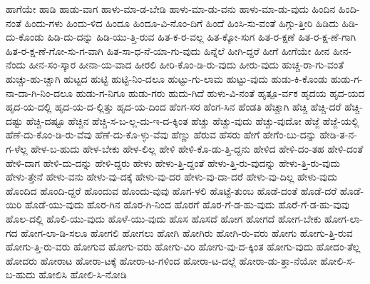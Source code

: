 {ಹಾಗೆಯೇ
ಹಾಡಿ
ಹಾಡು-ವಾಗ
ಹಾಳು-ಮಾ-ಡ-ಬೇಡಿ
ಹಾಳು-ಮಾ-ಡು-ವನು
ಹಾಳು-ಮಾ-ಡು-ವುದು
ಹಿಂದಿನ
ಹಿಂದಿ-ನಂತೆ
ಹಿಂದು-ಗಳು
ಹಿಂದು-ಳಿದ
ಹಿಂದೂ
ಹಿಂದೂ-ವಿ-ನೊಂ-ದಿಗೆ
ಹಿಂದೆ
ಹಿಂಸಿ-ಸು-ವಂತೆ
ಹಿಗ್ಗು-ತ್ತೀರಿ
ಹಿಡಿದು
ಹಿಡಿ-ದು-ಕೊಂಡು
ಹಿಡಿ-ದು-ದನ್ನು
ಹಿಡಿ-ಯು-ತ್ತಿ-ರುವ
ಹಿತ-ಕ-ರ-ವಲ್ಲ
ಹಿತ-ಕ್ಕೋ-ಸುಗ
ಹಿತ-ರ-ಕ್ಷಣೆ
ಹಿತ-ರ-ಕ್ಷ-ಣೆ-ಗಾಗಿ
ಹಿತ-ರ-ಕ್ಷ-ಣೆ-ಗೋ-ಸು-ಗ-ವಾಗಿ
ಹಿತ-ಸಾ-ಧ-ನೆ-ಯಾ-ಗು-ವುದು
ಹಿನ್ನೆಲೆ
ಹೀಗಿ-ದ್ದರೆ
ಹೀಗೆ
ಹೀಗೆಯೇ
ಹೀನ
ಹೀನ-ನೆಂದು
ಹೀನ-ಸಂ-ಸ್ಕಾರ
ಹೀನಾ-ಯ-ವಾದ
ಹೀರಲಿ
ಹೀರಿ-ಕೊಂ-ಡಿ-ರು-ವುದು
ಹೀರು-ವುದು
ಹುಚ್ಚ-ರಾ-ಗು-ವಂತೆ
ಹುಚ್ಚು-ಹು-ಚ್ಚಾಗಿ
ಹುಟ್ಟದ
ಹುಟ್ಟಿ
ಹುಟ್ಟಿ-ನಿಂ-ದಲೂ
ಹುಟ್ಟು-ಗು-ಲಾಮ
ಹುಟ್ಟು-ವುದು
ಹುಡು-ಕಿ-ಕೊಂಡು
ಹುಡು-ಗ-ನಾ-ದಾ-ಗಿ-ನಿಂ-ದಲೂ
ಹುಡು-ಗ-ನಿಗೂ
ಹುಡು-ಗರು
ಹುದು-ಗಿದೆ
ಹುಳು-ವಿ-ನಂತೆ
ಹೃತ್ಪೂ-ರ್ವಕ
ಹೃದಯ
ಹೃದ-ಯದ
ಹೃದ-ಯ-ದಲ್ಲಿ
ಹೃದ-ಯ-ದ-ಲ್ಲಿತ್ತು
ಹೃದ-ಯ-ದಿಂದ
ಹೆಂಗ-ಸರ
ಹೆಂಗ-ಸಿನ
ಹೆಂಡತಿ
ಹೆಚ್ಚಾಗಿ
ಹೆಚ್ಚಿ
ಹೆಚ್ಚಿ-ದರೆ
ಹೆಚ್ಚಿ-ದಷ್ಟು
ಹೆಚ್ಚಿ-ದಷ್ಟೂ
ಹೆಚ್ಚಿನ
ಹೆಚ್ಚಿ-ಸ-ಬ-ಲ್ಲ-ದು-ಇ-ದ-ಕ್ಕಿಂತ
ಹೆಚ್ಚು
ಹೆಚ್ಚು-ವುದು
ಹೆಚ್ಚು-ವುದೋ
ಹೆಜ್ಜೆ
ಹೆಜ್ಜೆ-ಯಲ್ಲಿ
ಹೆಣೆ-ದು-ಕೊಂ-ಡಿ-ರು-ವೆವು
ಹೆಣೆ-ದು-ಕೊ-ಳ್ಳು-ವೆವು
ಹೆಣ್ಣು
ಹೆರುವ
ಹೆಸರು
ಹೇಗೆ
ಹೇಗೆಂ-ಬು-ದನ್ನು
ಹೇಡಿ-ತ-ನ-ಗ-ಳೆಲ್ಲ
ಹೇಳ-ಬ-ಹುದು
ಹೇಳ-ಬೇಕು
ಹೇಳ-ಲಿಲ್ಲ
ಹೇಳಿ
ಹೇಳಿ-ಕೊ-ಡು-ತ್ತಿ-ದ್ದನು
ಹೇಳಿದ
ಹೇಳಿ-ದಂ-ತಹ
ಹೇಳಿ-ದಂತೆ
ಹೇಳಿ-ದಾಗ
ಹೇಳಿ-ದು-ದನ್ನು
ಹೇಳಿ-ದ್ದರು
ಹೇಳು
ಹೇಳು-ತ್ತಿ-ದ್ದಂತೆ
ಹೇಳು-ತ್ತಿ-ರು-ವುದನ್ನು
ಹೇಳು-ತ್ತಿ-ರು-ವುದು
ಹೇಳು-ತ್ತೇನೆ
ಹೇಳು-ವನು
ಹೇಳು-ವು-ದಕ್ಕೆ
ಹೇಳು-ವು-ದರ
ಹೇಳು-ವು-ದಾ-ದರೆ
ಹೇಳು-ವು-ದಿಲ್ಲ
ಹೇಳು-ವುದು
ಹೊಂದಿದ
ಹೊಂದಿ-ದ್ದರೆ
ಹೊಂದುವ
ಹೊಂದು-ವುವು
ಹೊಗ-ಳಲಿ
ಹೊಟ್ಟೆ-ತುಂಬ
ಹೊಡೆ-ದಂತೆ
ಹೊಡೆ-ದರೆ
ಹೊಡೆ-ಯಿರಿ
ಹೊಡೆ-ಯು-ವುದು
ಹೊರ-ಗಿನ
ಹೊರ-ಗಿ-ನಿಂದ
ಹೊರಗೆ
ಹೊರ-ಗೆ-ಡ-ಹು-ವುದು
ಹೊರೆ-ಗೆ-ಡ-ಹು-ವುವು
ಹೊಲ-ದಲ್ಲಿ
ಹೊಲಿ-ಯು-ವುದು
ಹೊಳೆ-ಯು-ವುದು
ಹೊಸ
ಹೊಸದೆ
ಹೋಗ
ಹೋಗದೆ
ಹೋಗ-ಬೇಕು
ಹೋಗ-ಲಾ-ಗದ
ಹೋಗ-ಲಾ-ಡಿ-ಸಲೂ
ಹೋಗಲಿ
ಹೋಗಲು
ಹೋಗಿ
ಹೋಗಿರು
ಹೋಗಿ-ರು-ವರು
ಹೋಗು
ಹೋಗು-ತ್ತಿ-ರುವ
ಹೋಗು-ತ್ತಿ-ರು-ವರು
ಹೋಗುವ
ಹೋಗು-ವರು
ಹೋಗು-ವಿರಿ
ಹೋಗು-ವು-ದ-ಕ್ಕಿಂತ
ಹೋಗು-ವುದು
ಹೋದಂ-ತೆಲ್ಲ
ಹೋದರು
ಹೋರಾಟ
ಹೋರಾ-ಟಕ್ಕೆ
ಹೋರಾ-ಟ-ಗಳಿಂದ
ಹೋರಾ-ಟ-ದಲ್ಲೆ
ಹೋರಾ-ಡು-ತ್ತಾ-ನೆಯೋ
ಹೋಲಿ-ಸ-ಬ-ಹುದು
ಹೋಲಿಸಿ
ಹೋಲಿ-ಸಿ-ನೋಡಿ
}
